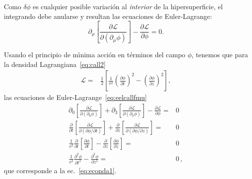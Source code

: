 Como $\delta\phi$ es cualquier posible variaci\'on al \emph{interior} de la  hipersuperficie, el integrando debe anularse y resultan las ecuaciones de Euler-Lagrange:
\begin{equation}
\label{eq:eelcallfmuold}
 \partial_\mu
  \left[
    \frac{\partial\mathcal{L}}{\partial
      (\partial_\mu\phi)}
  \right]-\frac{\partial\mathcal{L}}{\partial\phi}=0.
\end{equation}

Usando el principio de m\'\i nima acci\'on en t\'erminos del campo $\phi$, tenemos que para la densidad Lagrangiana~\eqref{eq:call2}
\begin{align}
  \mathcal{L}=&\frac{1}{2}  \left[
  \frac{1}{v^2}\left(\frac{\partial\phi}{\partial t}\right)^2-\left(\frac{\partial\phi}{\partial z}\right)^2
\right],
\end{align}
las ecuaciones de Euler-Lagrange~\eqref{eq:eelcallfmu}
\begin{align}
  \partial_0\left[\frac{\partial\mathcal{L}}{\partial(\partial_0\phi)}\right]+
\partial_3\left[\frac{\partial\mathcal{L}}{\partial(\partial_3\phi)}\right]
-\frac{\partial\mathcal{L}}{\partial\phi}=&0\nonumber\\
  \frac{\partial}{\partial t}\left[\frac{\partial\mathcal{L}}{\partial(\partial\phi/\partial t)}\right]+
\frac{\partial}{\partial z}\left[\frac{\partial\mathcal{L}}{\partial(\partial\phi/\partial z)}\right]
=&0\nonumber\\
 \frac{1}{v^2}\frac{\partial}{\partial t}\left[\frac{\partial\phi}{\partial t}\right]
-\frac{\partial}{\partial z}\left[\frac{\partial\phi}{\partial z}\right]=&0\nonumber\\
 \frac{1}{v^2}\frac{\partial^2\phi}{\partial t^2}-\frac{\partial^2\phi}{\partial z^2}=&0\,,
\end{align}
que corresponde a la ec.~\eqref{eq:econda1}.


